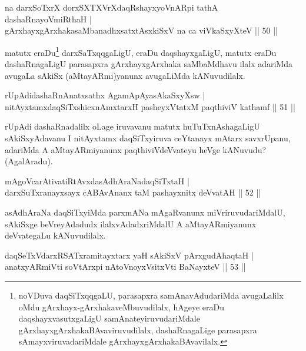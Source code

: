\begin{shl}
na darxSoTxrX dorxSXTXVrXdaqRshayxyoVnARpi tathA dashaRnayoVmiRthaH |\\
gArxhayxgArxhakasaMbanadhxsatxtAsxkiSxV na ca viVkaSxyXteV \hfill || 50 ||
\end{shl}

\begin{artha}%
matutx eraDu\footnote{noVDuva daqSiTxqqgaLU, parasapxra samAnavAdudariMda avugaLalilx oMdu gArxhayx-gArxhakaveMbuvudilalx, hAgeye eraDu daqshayxvasutxgaLigU samAnateyiruvudariMdale gArxhayxgArxhakaBAvaviruvudilalx, dashaRnagaLige parasapxra sAmayxviruvadariMdale gArxhayxgArxhakaBAvavilalx.} darxSaTxqqgaLigU, eraDu daqshayxgaLigU, matutx eraDu dashaRnagaLigU parasapxra gArxhayxgArxhaka saMbaMdhavu ilalx adariMda avugaLa sAkiSx (aMtayARmi)yanunx avugaLiMda kANuvudilalx.
\end{artha}

\begin{shl}
rUpAdidashaRnAnatxsathx AgamApAyasAkaSxyXsw |\\
nitAyxtamxdaqSiTxshicxnAmxtarxH pasheyxVtatxM paqthiviV kathamf \hfill || 51 ||
\end{shl}

\begin{artha}
rUpAdi dashaRnadalilx oLage iruvavanu matutx huTuTxnAshagaLigU sAkiSxyAdavanu I nitAyxtamx daqSiTxyiruva ceYtanayx mAtarx savxrUpanu, adariMda A aMtayARmiyanunx paqthiviVdeVvateyu heVge kANuvudu? (AgalAradu).
\end{artha}

\begin{shl}
mAgoVcarAtivatiRtAvxdasAdhAraNadaqSiTxtaH |\\
darxSuTxranayxsayx cABAvAnanx taM pashayxnitx deVvatAH \hfill || 52 ||
\end{shl}

\begin{artha}
asAdhAraNa daqSiTxyiMda parxmANa mAgaRvanunx miVriruvudariMdalU, sAkiSxge beVreyAdadudx ilalxvAdadxriMdalU A aMtayARmiyanunx deVvategaLu kANuvudilalx.
\end{artha}


\begin{shl}
daqSeTxVdarxRSATxramitayxtarx yaH sAkiSxV pArxgudAhaqtaH |\\
anatxyARmiVti soV\s tArxpi nAtoV\s noyxV\s sitxVti BaNayxteV \hfill || 53 ||
\end{shl}

